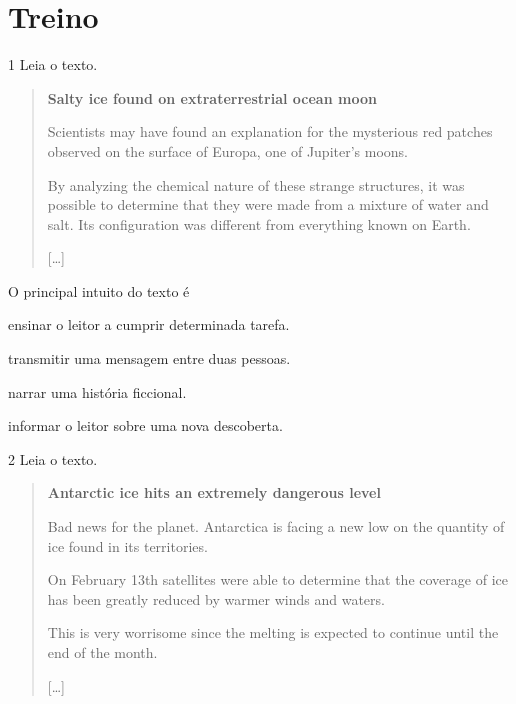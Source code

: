 
\section*{Treino}

\num{1} Leia o texto.

\begin{quote}
\textbf{Salty ice found on extraterrestrial ocean moon}

Scientists may have found an explanation for the mysterious red patches observed on the surface of Europa, one of Jupiter’s moons.

By analyzing the chemical nature of these strange structures, it was possible to determine that they were made from a mixture of water and salt. Its configuration was different from everything known on Earth.

{[}\ldots{}{]}

\end{quote}


O principal intuito do texto é

\begin{escolha}
\item ensinar o leitor a cumprir determinada tarefa.

\item transmitir uma mensagem entre duas pessoas.

\item narrar uma história ficcional.

\item informar o leitor sobre uma nova descoberta.
\end{escolha}

\num{2} Leia o texto.

\begin{quote}
\textbf{Antarctic ice hits an extremely dangerous level}

Bad news for the planet. Antarctica is facing a new low on the quantity of ice found in its territories.

On February 13th satellites were able to determine that the coverage of ice has been greatly reduced by warmer winds and waters.

This is very worrisome since the melting is expected to continue until the end of the month.  

{[}\ldots{}{]}

\end{quote}

